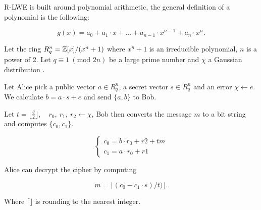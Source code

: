\begin{definition}
    R-LWE is built around polynomial arithmetic, the general definition of a
    polynomial is the following:

    \[
        g(x) = a_0 + a_1 \cdot x + \ldots + a_{n-1} \cdot x^{n-1} + a_n \cdot
        x^n.
    \]

    Let the ring $R_q^n = \mathbb{Z}[x]/(x^n + 1)$ where $x^n + 1$ is an irreducible
    polynomial, $n$ is a power of 2. Let $q \equiv 1\ (\text{mod } 2n)$ be a
    large prime number and $\chi$ a Gaussian distribution
    \citep{FPGA_Post_Quantum_Primitives}.

    Let Alice pick a public vector $a \in R_q^n$, a secret vector $s \in R_q^n$
    and an error $\chi \leftarrow e$. We calculate $b = a \cdot s + e$ and send
    $\{a,b\}$ to Bob.


\end{definition}

\begin{definition}
    Let $t = \lfloor \frac{q}{2} \rfloor, \quad r_0,\ r_1,\ r_2
    \leftarrow \chi$, Bob then converts the message $m$ to a bit string and
    computes $\{c_0, c_1\}$.

    \[
        \begin{cases}
            c_0 = b \cdot r_0 + r2 + tm\\
            c_1 = a \cdot r_0 + r1
        \end{cases}
    \]

\end{definition}

\begin{definition}
    Alice can decrypt the cipher by computing

    \[m = \lceil (c_0 - c_1 \cdot s) / t) \rfloor. \]

    Where $\lceil \rfloor$ is rounding to the nearest integer.
\end{definition}

